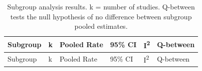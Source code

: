 \documentclass[
  11pt,
  a4paper,
]{article}
\begin{document}
\begin{longtable}[]{@{}
  >{\raggedright\arraybackslash}p{}
  >{\raggedright\arraybackslash}p{}
  >{\raggedright\arraybackslash}p{}
  >{\raggedright\arraybackslash}p{}
  >{\raggedright\arraybackslash}p{}
  >{\raggedright\arraybackslash}p{}@{}}
\caption{Subgroup analysis results. k = number of studies. Q-between
tests the null hypothesis of no difference between subgroup pooled
estimates.}\label{tbl-subgroup}\tabularnewline
\toprule\noalign{}
\begin{minipage}[b]{\linewidth}\raggedright
Subgroup
\end{minipage} & \begin{minipage}[b]{\linewidth}\raggedright
k
\end{minipage} & \begin{minipage}[b]{\linewidth}\raggedright
Pooled Rate
\end{minipage} & \begin{minipage}[b]{\linewidth}\raggedright
95\% CI
\end{minipage} & \begin{minipage}[b]{\linewidth}\raggedright
I\textsuperscript{2}
\end{minipage} & \begin{minipage}[b]{\linewidth}\raggedright
Q-between
\end{minipage} \\
\midrule\noalign{}
\endfirsthead
\toprule\noalign{}
\begin{minipage}[b]{\linewidth}\raggedright
Subgroup
\end{minipage} & \begin{minipage}[b]{\linewidth}\raggedright
k
\end{minipage} & \begin{minipage}[b]{\linewidth}\raggedright
Pooled Rate
\end{minipage} & \begin{minipage}[b]{\linewidth}\raggedright
95\% CI
\end{minipage} & \begin{minipage}[b]{\linewidth}\raggedright
I\textsuperscript{2}
\end{minipage} & \begin{minipage}[b]{\linewidth}\raggedright
Q-between
\end{minipage} \\

\end{longtable}
\end{document}
